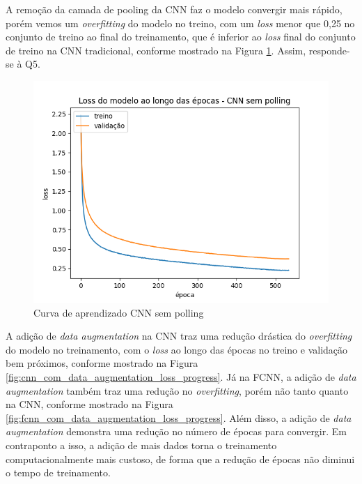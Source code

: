 \documentclass[12pt]{article}
\begin{document}
A remoção da camada de pooling da CNN faz o modelo convergir mais rápido, porém vemos um \textit{overfitting} do modelo no treino, com um \textit{loss} menor que 0,25 no conjunto de treino ao final do treinamento, que é inferior ao \textit{loss} final do conjunto de treino na CNN tradicional, conforme mostrado na Figura \ref{fig:cnn_sem_polling_loss_progress}. Assim, responde-se à Q5.

\begin{figure}[ht]
  \centering
  \includegraphics[width=.5\textwidth]{../images/results_plt/cnn_sem_polling_loss_progress.png}
  \caption{Curva de aprendizado CNN sem polling}
  \label{fig:cnn_sem_polling_loss_progress}
\end{figure}

A adição de \textit{data augmentation} na CNN traz uma redução drástica do \textit{overfitting} do modelo no treinamento, com o \textit{loss} ao longo das épocas no treino e validação bem próximos, conforme mostrado na Figura \ref{fig:cnn_com_data_augmentation_loss_progress}. Já na FCNN, a adição de \textit{data augmentation} também traz uma redução no \textit{overfitting}, porém não tanto quanto na CNN, conforme mostrado na Figura \ref{fig:fcnn_com_data_augmentation_loss_progress}. Além disso, a adição de \textit{data augmentation} demonstra uma redução no número de épocas para convergir. Em contraponto a isso, a adição de mais dados torna o treinamento computacionalmente mais custoso, de forma que a redução de épocas não diminui o tempo de treinamento.
\end{document}
